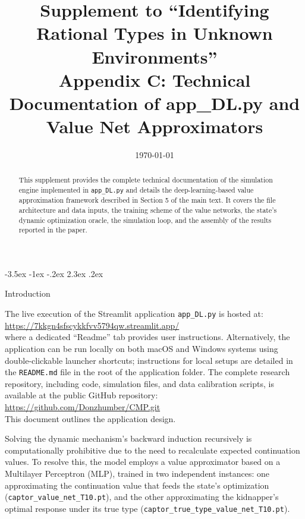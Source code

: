 \documentclass[12pt]{article}
\makeatletter
\newcommand{\pyfile}[1]{\texttt{#1}}
\numberwithin{equation}{section}
\numberwithin{table}{section}
\renewcommand\section{\@startsection {section}{1}{\z@}%
                                   {-3.5ex \@plus -1ex \@minus -.2ex}%
                                   {2.3ex \@plus.2ex}%
                                   {\normalfont\Large\bfseries\raggedright}}
\makeatother
\begin{document}
\title{Supplement to ``Identifying Rational Types in Unknown Environments''\\
Appendix C: Technical Documentation of app\_DL.py and Value Net Approximators}
\author{}
\date{\today}
\maketitle

\begin{abstract}
\singlespacing
This supplement provides the complete technical documentation of the simulation engine implemented in \pyfile{app\_DL.py} and details the deep-learning-based value approximation framework described in Section 5 of the main text. It covers the file architecture and data inputs, the training scheme of the value networks, the state's dynamic optimization oracle, the simulation loop, and the assembly of the results reported in the paper.
\end{abstract}

\section{Introduction}

The live execution of the Streamlit application \pyfile{app\_DL.py} is hosted at:\\
\url{https://7kkgn4sfscykkfvv5794qw.streamlit.app/}\\
where a dedicated ``Readme'' tab provides user instructions. Alternatively, the application can be run locally on both macOS and Windows systems using double-clickable launcher shortcuts; instructions for local setups are detailed in the \texttt{README.md} file in the root of the application folder. The complete research repository, including code, simulation files, and data calibration scripts, is available at the public GitHub repository:\\
\url{https://github.com/Donzhumber/CMP.git}\\
This document outlines the application design.

Solving the dynamic mechanism's backward induction recursively is computationally prohibitive due to the need to recalculate expected continuation values. To resolve this, the model employs a value approximator based on a Multilayer Perceptron (MLP), trained in two independent instances: one approximating the continuation value that feeds the state's optimization (\pyfile{captor\_value\_net\_T10.pt}), and the other approximating the kidnapper's optimal response under its true type (\pyfile{captor\_true\_type\_value\_net\_T10.pt}).
\end{document}
